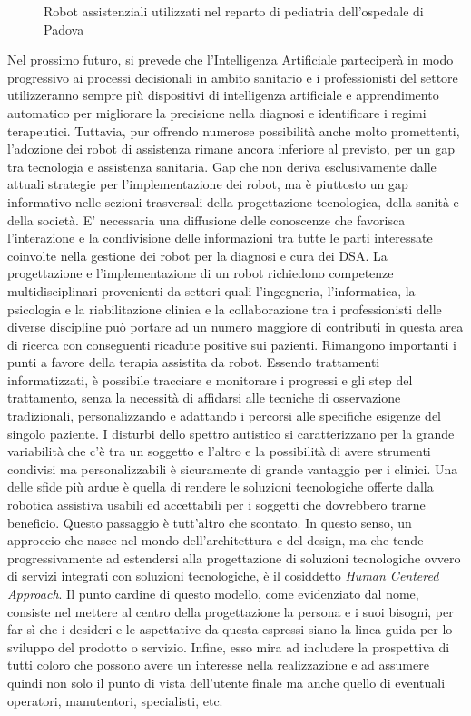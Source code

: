 \begin{sloppypar}
{\begin{figure}[H]
\caption{Robot assistenziali utilizzati nel reparto di pediatria dell'ospedale di Padova}
\end{figure}
\vspace{1cm}
\newpage
Nel prossimo futuro, si prevede che l’Intelligenza Artificiale parteciperà in modo progressivo ai processi decisionali in ambito sanitario e i professionisti del settore  utilizzeranno sempre più dispositivi di intelligenza artificiale e apprendimento automatico per migliorare la precisione nella diagnosi e identificare i regimi terapeutici.\newline
Tuttavia, pur offrendo numerose possibilità anche molto promettenti, l’adozione dei robot di assistenza rimane ancora inferiore al previsto, per un gap tra tecnologia e assistenza sanitaria. Gap che non deriva esclusivamente dalle attuali strategie per l’implementazione dei robot, ma è piuttosto un gap informativo nelle sezioni trasversali della progettazione tecnologica, della sanità e della società.\newline
E’ necessaria una diffusione delle conoscenze che favorisca l’interazione e la condivisione delle informazioni tra tutte le parti interessate coinvolte  nella gestione dei robot per la diagnosi e cura dei DSA. La progettazione e l'implementazione di un robot richiedono competenze multidisciplinari provenienti da settori quali l'ingegneria, l'informatica, la psicologia e la riabilitazione clinica e la collaborazione tra i professionisti delle diverse discipline può portare ad un numero maggiore di contributi in questa area di ricerca con conseguenti ricadute positive sui pazienti.
\newline
Rimangono importanti i punti a favore della terapia assistita da robot. Essendo trattamenti informatizzati, è possibile tracciare e monitorare i progressi e gli step del trattamento, senza la necessità di affidarsi alle tecniche di osservazione tradizionali, personalizzando e adattando i percorsi alle specifiche esigenze del singolo paziente.\newline
I disturbi dello spettro autistico si caratterizzano per la grande variabilità che c’è tra un soggetto e l’altro e la possibilità di avere strumenti condivisi ma personalizzabili è sicuramente di grande vantaggio per i clinici.
Una delle sfide più ardue è quella di rendere le soluzioni tecnologiche offerte dalla robotica assistiva usabili ed accettabili per i soggetti che dovrebbero trarne beneficio. Questo passaggio è tutt’altro che scontato. In questo senso, un approccio che nasce nel mondo dell’architettura e del design, ma che tende progressivamente ad estendersi alla progettazione di soluzioni tecnologiche ovvero di servizi integrati con soluzioni tecnologiche, è il cosiddetto \textit{Human Centered Approach}. Il punto cardine di questo modello, come evidenziato dal nome, consiste nel mettere al centro della progettazione la persona e i suoi bisogni, per far sì che i desideri e le aspettative da questa espressi siano la linea guida per lo sviluppo del prodotto o servizio. Infine, esso mira ad includere la prospettiva di tutti coloro che possono avere un interesse nella realizzazione e ad assumere quindi non solo il punto di vista dell’utente finale ma anche quello di eventuali operatori, manutentori, specialisti, etc.
}
\newpage

\end{sloppypar}
